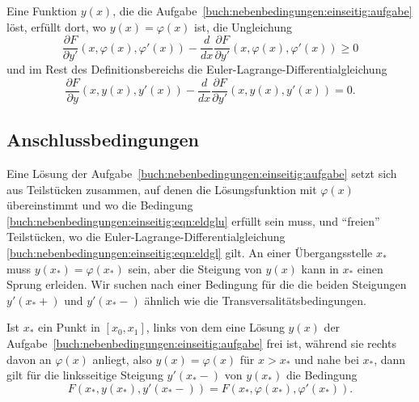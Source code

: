 \begin{satz}
Eine Funktion $y(x)$, die die
Aufgabe~\ref{buch:nebenbedingungen:einseitig:aufgabe}
löst, erfüllt dort, wo $y(x)=\varphi(x)$ ist, die Ungleichung
\begin{equation}
\frac{\partial F}{\partial y'}(x,\varphi(x),\varphi'(x))
-
\frac{d}{dx}\frac{\partial F}{\partial y'}(x,\varphi(x),\varphi'(x))
\ge
0
\label{buch:nebenbedingungen:einseitig:eqn:eldglu}
\end{equation}
und im Rest des Definitionsbereichs die Euler-Lagrange-Differentialgleichung
\begin{equation}
\frac{\partial F}{\partial y}(x,y(x),y'(x))
-
\frac{d}{dx}
\frac{\partial F}{\partial y'}(x,y(x),y'(x))
=
0.
\label{buch:nebenbedingungen:einseitig:eqn:eldgl}
\end{equation}
\end{satz}

%
%
\subsection{Anschlussbedingungen
\label{buch:nebenbedingungen:einseitig:subsection:anschluss}}
Eine Lösung der
Aufgabe~\ref{buch:nebenbedingungen:einseitig:aufgabe}
setzt sich aus Teilstücken zusammen, auf denen die Lösungsfunktion mit
$\varphi(x)$ übereinstimmt und wo die Bedingung
\eqref{buch:nebenbedingungen:einseitig:eqn:eldglu}
erfüllt sein muss, und ``freien'' Teilstücken, wo die
Euler-Lagrange-Differentialgleichung
\eqref{buch:nebenbedingungen:einseitig:eqn:eldgl} gilt.
An einer Übergangsstelle $x_*$ muss $y(x_*)=\varphi(x_*)$ sein,
aber die Steigung von $y(x)$ kann in $x_*$ einen Sprung
erleiden.
Wir suchen nach einer Bedingung für die die beiden Steigungen 
$y'(x_*+)$ und $y'(x_*-)$ ähnlich wie die Transversalitätsbedingungen.

\begin{satz}[Anschlussbedingungen]
Ist $x_*$ ein Punkt in $[x_0,x_1]$, links von dem eine Lösung $y(x)$ der
Aufgabe~\ref{buch:nebenbedingungen:einseitig:aufgabe}
frei ist, während sie rechts davon an $\varphi(x)$ anliegt, also
$y(x) = \varphi(x)$ für $x>x_*$ und nahe bei $x_*$, dann gilt
für die linksseitige Steigung $y'(x_*-)$ von $y(x_*)$ die
Bedingung
\[
F(x_*,y(x_*),y'(x_*-)) = F(x_*,\varphi(x_*),\varphi'(x_*)).
\]
\end{satz}

